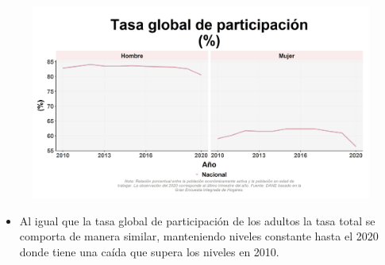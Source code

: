     \begin{figure}[H]
        \caption[Tasa global de participación por género/ ]{\label{partic_gen_trend} }
        \begin{center}
        \includegraphics[width=\textwidth,keepaspectratio]{img/var_79_trend.png}
        \end{center}
    \end{figure}
            \begin{itemize}
                \item Al igual que la tasa global de participación de los adultos la tasa total se comporta de manera similar, manteniendo niveles constante hasta el 2020 donde tiene una caída que supera los niveles en 2010.
                \end{itemize}

